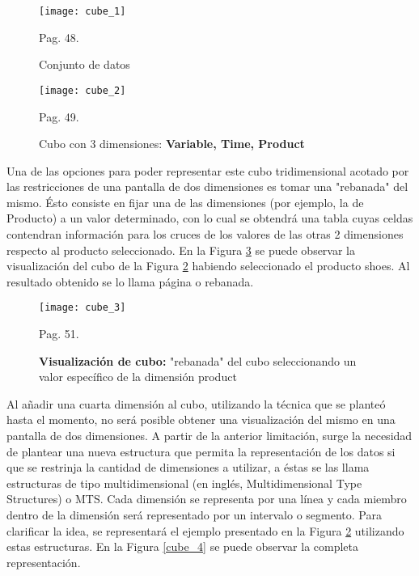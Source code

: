 \documentclass[a4paper,11pt]{article}
\begin{document}
\begin{flushleft}
    \begin{figure}
      \begin{center}
        \texttt{[image: cube\_1]}
        \caption{Conjunto de datos} \cite{olap_solutions} Pag. 48.
        \label{tab_cube}
      \end{center}
    \end{figure}
    
    \begin{figure}
      \begin{center}
        \texttt{[image: cube\_2]}
        \caption{Cubo con 3 dimensiones: \textbf{Variable, Time, Product}} \cite{olap_solutions} Pag. 49.
        \label{cube_2}
      \end{center}
    \end{figure}
    
    
    Una de las opciones para poder representar este cubo tridimensional acotado por las restricciones de una pantalla de dos dimensiones es tomar una
    "rebanada" del mismo. Ésto consiste en fijar una de las dimensiones (por ejemplo, la de Producto) a un valor determinado, con lo cual se obtendrá una
    tabla cuyas celdas contendran información para los cruces de los valores de las otras 2 dimensiones respecto al producto seleccionado. En la Figura
    \ref{cube_3} se puede observar la visualización del cubo de la Figura \ref{cube_2} habiendo seleccionado el producto shoes. Al resultado obtenido se
    lo llama página o rebanada.\par 
    
    \begin{figure}
      \begin{center}
        \texttt{[image: cube\_3]}
        \caption{\textbf{Visualización de cubo:} "rebanada" del cubo seleccionando un valor específico de la dimensión product} \cite{olap_solutions} Pag. 51.
        \label{cube_3}
      \end{center}
    \end{figure}
    
    
    Al añadir una cuarta dimensión al cubo, utilizando la técnica que se planteó hasta el momento, no será posible obtener una visualización del mismo en una
    pantalla de dos dimensiones. A partir de la anterior limitación, surge la necesidad de plantear una nueva estructura que permita la representación de los
    datos si que se restrinja la cantidad de dimensiones a utilizar, a éstas se las llama estructuras de tipo multidimensional (en inglés, Multidimensional Type
    Structures) o MTS. Cada dimensión se representa por una línea y cada miembro dentro de la dimensión será representado por un intervalo o segmento. Para
    clarificar la idea, se representará el ejemplo presentado en la Figura \ref{cube_2} utilizando estas estructuras. En la Figura \ref{cube_4} se puede observar
    la completa representación.
    

\end{flushleft}
\end{document}
